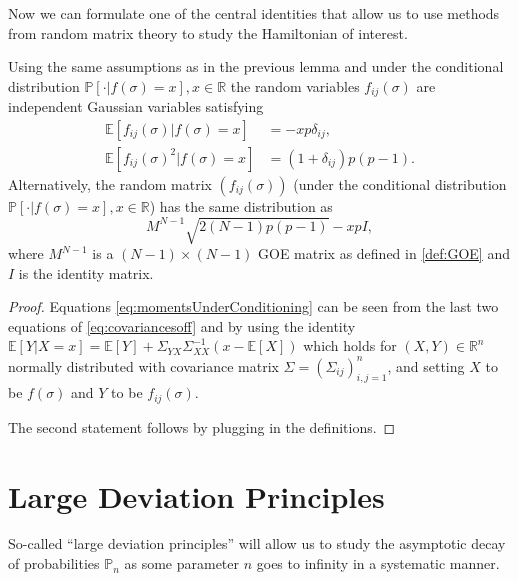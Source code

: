 Now we can formulate one of the central identities that allow us to use methods from random matrix theory to study the Hamiltonian of interest.

\begin{lemma}
	Using the same assumptions as in the previous lemma and under the conditional distribution $\mathbb P[\cdot|f(\sigma)=x], x\in\mathbb R$ the random variables $f_{ij}(\sigma)$ are independent Gaussian variables satisfying
	\begin{align}\label{eq:momentsUnderConditioning}
		\mathbb E[f_{ij}(\sigma)|f(\sigma)=x]&=-xp\delta_{ij},\nonumber\\
		\mathbb E[f_{ij}(\sigma)^2|f(\sigma)=x]&=(1+\delta_{ij})p(p-1).
	\end{align}
	Alternatively, the random matrix $(f_{ij}(\sigma))$ (under the conditional distribution $\mathbb P[\cdot|f(\sigma)=x], x\in\mathbb R$) has the same distribution as $$M^{N-1}\sqrt{2(N-1)p(p-1)}-xpI,$$
	where $M^{N-1}$ is a $(N-1)\times(N-1)$ GOE matrix as defined in \ref{def:GOE} and $I$ is the identity matrix.
\end{lemma}
\begin{proof}
	Equations \eqref{eq:momentsUnderConditioning} can be seen from the last two equations of \eqref{eq:covariancesoff} and by using the identity $\mathbb E[Y|X=x] = \mathbb E[Y] + \Sigma_{YX}\Sigma^{-1}_{XX}(x-\mathbb E[X])$ which holds for $(X,Y)\in\mathbb R^n$ normally distributed with covariance matrix $\Sigma = (\Sigma_{ij})_{i,j=1}^n$, and setting $X$ to be $f(\sigma)$ and $Y$ to be $f_{ij}(\sigma)$.
	
	
	The second statement follows by plugging in the definitions.
\end{proof}




\section{Large Deviation Principles}
So-called ``large deviation principles'' will allow us to study the asymptotic decay of probabilities $\mathbb P_n$ as some parameter $n$ goes to infinity in a systematic manner.

